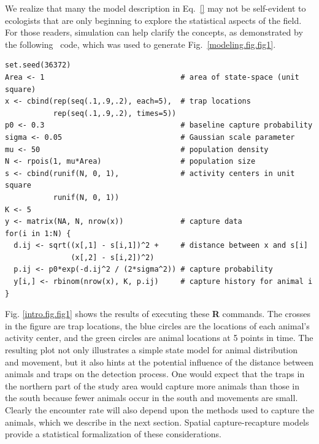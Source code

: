 We realize that many the model description in Eq.~\ref{} may not be
self-evident to ecologists that are only beginning to explore the
statistical aspects of the field. For those readers, simulation can
help clarify the concepts, as demonstrated by the following \R~code,
which was used to generate Fig.~\ref{modeling.fig.fig1}.
\begin{small}
\begin{verbatim}
set.seed(36372)
Area <- 1                               # area of state-space (unit square)
x <- cbind(rep(seq(.1,.9,.2), each=5),  # trap locations
           rep(seq(.1,.9,.2), times=5))
p0 <- 0.3                               # baseline capture probability
sigma <- 0.05                           # Gaussian scale parameter
mu <- 50                                # population density
N <- rpois(1, mu*Area)                  # population size
s <- cbind(runif(N, 0, 1),              # activity centers in unit square
           runif(N, 0, 1))
K <- 5
y <- matrix(NA, N, nrow(x))             # capture data
for(i in 1:N) {
  d.ij <- sqrt((x[,1] - s[i,1])^2 +     # distance between x and s[i]
               (x[,2] - s[i,2])^2)
  p.ij <- p0*exp(-d.ij^2 / (2*sigma^2)) # capture probability
  y[i,] <- rbinom(nrow(x), K, p.ij)     # capture history for animal i
}
\end{verbatim}
\end{small}

Fig. \ref{intro.fig.fig1} shows the results of executing these {\bf R} commands. The crosses
in the figure are trap locations, the blue circles are the locations
of each animal's activity center, and the green circles are animal
locations at 5 points in time.  The resulting plot not only
illustrates a simple state model for animal distribution and movement,
but it also hints at the potential influence of the distance between
animals and traps on the detection process. One would expect that the
traps in the northern part of the study area would capture more
animals than those in the south because fewer animals occur in the
south and movements are small. Clearly the encounter rate will also
depend upon the methods used to capture the animals, which we describe
in the next section.  Spatial capture-recapture models provide a
statistical formalization of these considerations.


